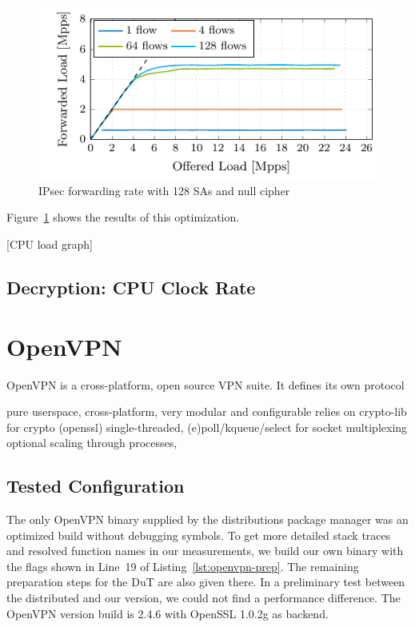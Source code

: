 \documentclass[IN,11pt,twoside,openright,master,english]{tumthesis}
\begin{document}
\begin{figure}[h]
	\centering
	\includegraphics[width=0.7\linewidth]{figures/ipsec_multi_sa_no_cipher_fwd_60_bytes_variable_flows}
	\caption{IPsec forwarding rate with 128 SAs and null cipher}
	\label{fig:ipsecmultisafwd60bytesvariableflows}
\end{figure}

Figure~\ref{fig:ipsecmultisafwd60bytesvariableflows} shows the results of this optimization.


[CPU load graph]
\subsection{Decryption: CPU Clock Rate}

\section{OpenVPN}

OpenVPN is a cross-platform, open source VPN suite. It defines its own protocol 

pure userspace, cross-platform, very modular and configurable
relies on crypto-lib for crypto (openssl)
single-threaded, (e)poll/kqueue/select for socket multiplexing
optional scaling through processes,

\subsection{Tested Configuration}


The only OpenVPN binary supplied by the distributions package manager was an optimized build without debugging symbols. To get more detailed stack traces and resolved function names in our measurements, we build our own binary with the flags shown in Line~19 of Listing~\ref{lst:openvpn-prep}. The remaining preparation steps for the DuT are also given there. In a preliminary test between the distributed and our version, we could not find a performance difference. The OpenVPN version build is 2.4.6 with OpenSSL 1.0.2g as backend.
\end{document}
